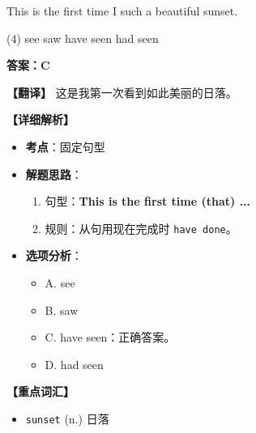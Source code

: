 \documentclass[11pt, a4paper]{article}
\newcommand{\analysis}[4]{
    \begin{solutionbox}
        \textbf{答案：#1}
        
        \textbf{【翻译】} #2
        
        \textbf{【详细解析】}
        #3
        
        \textbf{【重点词汇】}
        #4
    \end{solutionbox}
}
\newcommand{\blank}{\underline{\hspace{1.5cm}}}
\begin{document}
\begin{questions}
    \item This is the first time I \blank such a beautiful sunset.
    \begin{tasks}(4)
        \task see \task saw \task have seen \task had seen
    \end{tasks}
    \analysis{C}{这是我第一次看到如此美丽的日落。}{
        \begin{itemize}
            \item \textbf{考点}：固定句型
            \item \textbf{解题思路}：
                \begin{enumerate}
                    \item 句型：\textbf{This is the first time (that) ...}
                    \item 规则：从句用现在完成时 \texttt{have done}。
                \end{enumerate}
            \item \textbf{选项分析}：
                \begin{itemize}
                    \item A. see
                    \item B. saw
                    \item C. have seen：正确答案。
                    \item D. had seen
                \end{itemize}
        \end{itemize}
    }{
        \begin{itemize}
            \item \texttt{sunset} (n.) 日落
        \end{itemize}
    }


\end{questions}
\end{document}
